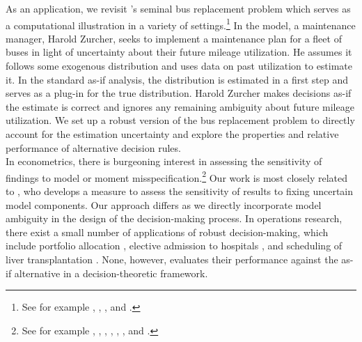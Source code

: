 {As an application, we revisit \cite{Rust.1987}'s seminal bus replacement problem which serves as a computational illustration in a variety of settings.\footnote{See for example \cite{Christensen.2019}, \cite{Iskhakov.2016}, \cite{Reich.2018}, and \cite{Su.2012a}.}  In the model, a maintenance manager, Harold Zurcher, seeks to implement a maintenance plan for a fleet of buses in light of uncertainty about their future mileage utilization. He assumes it follows some exogenous distribution and uses data on past utilization to estimate it. In the standard as-if analysis, the distribution is estimated in a first step and serves as a plug-in for the true distribution. Harold Zurcher makes decisions as-if the estimate is correct and ignores any remaining ambiguity about future mileage utilization. We set up a robust version of the bus replacement problem to directly account for the estimation uncertainty and explore the properties and relative performance of alternative decision rules.\\

In econometrics, there is burgeoning interest in assessing the sensitivity of findings to model or moment misspecification.\footnote{See for example \cite{Andrews.2020}, \cite{Andrews.2017}, \cite{Armstrong.2021}, \cite{Bonhomme.2020}, \cite{Chernozhukov.2020},  \cite{Christensen.2019}, and \cite{Honore.2020}.} Our work is most closely related to \cite{Jorgensen.2021}, who develops a measure to assess the sensitivity of results to fixing uncertain model components. Our approach differs as we directly incorporate model ambiguity in the design of the decision-making process. In operations research, there exist a small number of applications of robust decision-making, which include portfolio allocation \cite{Zymler.2013}, elective admission to hospitals \cite{Meng.2015}, and scheduling of liver transplantation \cite{Kaufman.2017}. None, however, evaluates their performance against the as-if alternative in a decision-theoretic framework.\\



	
	
 

% 
 

%


}  %

